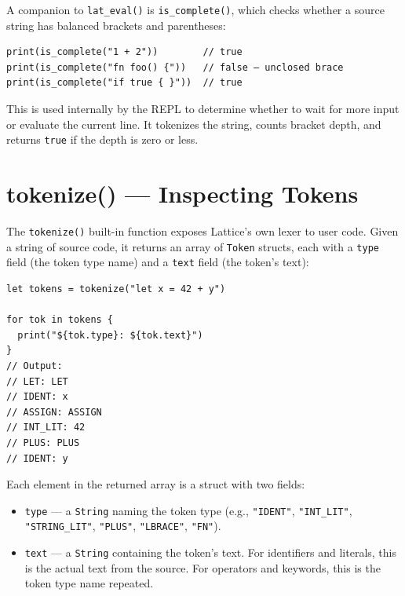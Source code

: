 
A companion to \lstinline|lat_eval()| is \lstinline|is_complete()|, which checks whether a source string has balanced brackets and parentheses:

\begin{lstlisting}[language=Lattice, caption={Checking source completeness}]
print(is_complete("1 + 2"))        // true
print(is_complete("fn foo() {"))   // false — unclosed brace
print(is_complete("if true { }"))  // true
\end{lstlisting}

This is used internally by the REPL to determine whether to wait for more input or evaluate the current line.
It tokenizes the string, counts bracket depth, and returns \lstinline|true| if the depth is zero or less.

\section{tokenize() --- Inspecting Tokens}\label{sec:tokenize}


The \lstinline|tokenize()| built-in function exposes Lattice's own lexer to user code.
Given a string of source code, it returns an array of \lstinline|Token| structs, each with a \lstinline|type| field (the token type name) and a \lstinline|text| field (the token's text):

\begin{lstlisting}[language=Lattice, caption={Tokenizing Lattice source code}]
let tokens = tokenize("let x = 42 + y")

for tok in tokens {
  print("${tok.type}: ${tok.text}")
}
// Output:
// LET: LET
// IDENT: x
// ASSIGN: ASSIGN
// INT_LIT: 42
// PLUS: PLUS
// IDENT: y
\end{lstlisting}

Each element in the returned array is a struct with two fields:

\begin{itemize}
  \item \lstinline|type| --- a \lstinline|String| naming the token type
        (e.g., \lstinline|"IDENT"|, \lstinline|"INT_LIT"|, \lstinline|"STRING_LIT"|,
        \lstinline|"PLUS"|, \lstinline|"LBRACE"|, \lstinline|"FN"|).
  \item \lstinline|text| --- a \lstinline|String| containing the token's text.
        For identifiers and literals, this is the actual text from the source.
        For operators and keywords, this is the token type name repeated.
\end{itemize}

